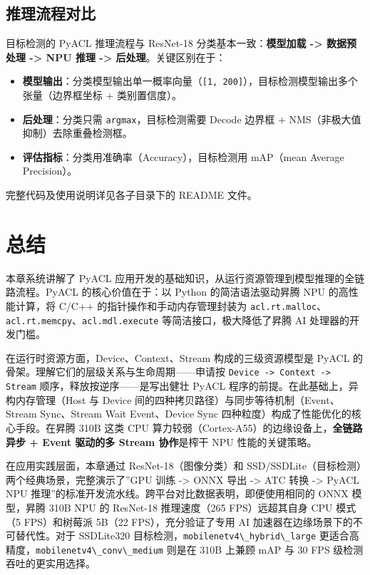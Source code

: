 \subsection{推理流程对比}\label{src-book-chapter4-h34}

目标检测的 PyACL 推理流程与 ResNet-18 分类基本一致：\textbf{模型加载
-\textgreater{} 数据预处理 -\textgreater{} NPU 推理 -\textgreater{}
后处理}。关键区别在于：

\begin{itemize}
\tightlist
\item
  \textbf{模型输出}：分类模型输出单一概率向量（\passthrough{\lstinline![1, 200]!}），目标检测模型输出多个张量（边界框坐标
  + 类别置信度）。
\item
  \textbf{后处理}：分类只需
  \passthrough{\lstinline!argmax!}，目标检测需要 Decode 边界框 +
  NMS（非极大值抑制）去除重叠检测框。
\item
  \textbf{评估指标}：分类用准确率（Accuracy），目标检测用 mAP（mean
  Average Precision）。
\end{itemize}

完整代码及使用说明详见各子目录下的 README 文件。

\section{总结}\label{src-book-chapter4-h35}

本章系统讲解了 PyACL
应用开发的基础知识，从运行资源管理到模型推理的全链路流程。PyACL
的核心价值在于：以 Python 的简洁语法驱动昇腾 NPU 的高性能计算，将 C/C++
的指针操作和手动内存管理封装为
\passthrough{\lstinline!acl.rt.malloc!}、\passthrough{\lstinline!acl.rt.memcpy!}、\passthrough{\lstinline!acl.mdl.execute!}
等简洁接口，极大降低了昇腾 AI 处理器的开发门槛。

在运行时资源方面，Device、Context、Stream 构成的三级资源模型是 PyACL
的骨架。理解它们的层级关系与生命周期------申请按
\passthrough{\lstinline!Device -> Context -> Stream!}
顺序，释放按逆序------是写出健壮 PyACL
程序的前提。在此基础上，异构内存管理（Host 与 Device
间的四种拷贝路径）与同步等待机制（Event、Stream Sync、Stream Wait
Event、Device Sync 四种粒度）构成了性能优化的核心手段。在昇腾 310B 这类
CPU 算力较弱（Cortex-A55）的边缘设备上，\textbf{全链路异步 + Event
驱动的多 Stream 协作}是榨干 NPU 性能的关键策略。

在应用实践层面，本章通过 ResNet-18（图像分类）和
SSD/SSDLite（目标检测）两个经典场景，完整演示了''GPU 训练
-\textgreater{} ONNX 导出 -\textgreater{} ATC 转换 -\textgreater{} PyACL
NPU 推理''的标准开发流水线。跨平台对比数据表明，即便使用相同的 ONNX
模型，昇腾 310B NPU 的 ResNet-18 推理速度（265 FPS）远超其自身 CPU
模式（5 FPS）和树莓派 5B（22 FPS），充分验证了专用 AI
加速器在边缘场景下的不可替代性。对于 SSDLite320
目标检测，\passthrough{\lstinline!mobilenetv4\_hybrid\_large!}
更适合高精度，\passthrough{\lstinline!mobilenetv4\_conv\_medium!} 则是在
310B 上兼顾 mAP 与 30 FPS 级检测吞吐的更实用选择。

